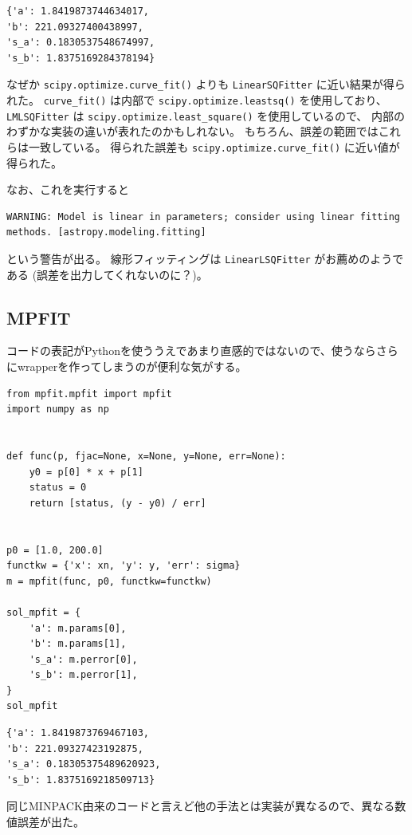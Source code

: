 \documentclass[a4paper, 8pt, notitlepage, uplatex, dvipdfmx]{jsarticle}
\begin{document}
\label{}
\begin{verbatim}
{'a': 1.8419873744634017,
'b': 221.09327400438997,
's_a': 0.1830537548674997,
's_b': 1.8375169284378194}
\end{verbatim}

なぜか \texttt{scipy.optimize.curve\_fit()} よりも \texttt{LinearSQFitter} に近い結果が得られた。
\texttt{curve\_fit()} は内部で \texttt{scipy.optimize.leastsq()} を使用しており、 \texttt{LMLSQFitter} は \texttt{scipy.optimize.least\_square()} を使用しているので、
内部のわずかな実装の違いが表れたのかもしれない。
もちろん、誤差の範囲ではこれらは一致している。
得られた誤差も \texttt{scipy.optimize.curve\_fit()} に近い値が得られた。

なお、これを実行すると
\begin{verbatim}
WARNING: Model is linear in parameters; consider using linear fitting methods. [astropy.modeling.fitting]
\end{verbatim}
という警告が出る。
線形フィッティングは \texttt{LinearLSQFitter} がお薦めのようである (誤差を出力してくれないのに？)。
\subsection{MPFIT}
\label{sec:orgb3583d9}
コードの表記がPythonを使ううえであまり直感的ではないので、使うならさらにwrapperを作ってしまうのが便利な気がする。

\begin{verbatim}
from mpfit.mpfit import mpfit
import numpy as np


def func(p, fjac=None, x=None, y=None, err=None):
    y0 = p[0] * x + p[1]
    status = 0
    return [status, (y - y0) / err]


p0 = [1.0, 200.0]
functkw = {'x': xn, 'y': y, 'err': sigma}
m = mpfit(func, p0, functkw=functkw)

sol_mpfit = {
    'a': m.params[0],
    'b': m.params[1],
    's_a': m.perror[0],
    's_b': m.perror[1],
}
sol_mpfit
\end{verbatim}

\label{}
\begin{verbatim}
{'a': 1.8419873769467103,
'b': 221.09327423192875,
's_a': 0.18305375489620923,
's_b': 1.8375169218509713}
\end{verbatim}

同じMINPACK由来のコードと言えど他の手法とは実装が異なるので、異なる数値誤差が出た。
\end{document}
